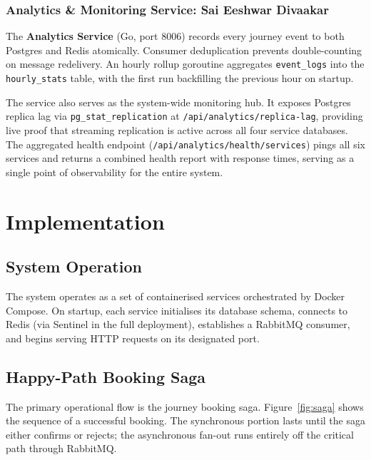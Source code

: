 \documentclass[12pt,a4paper]{article}
\begin{document}
\subsubsection{Analytics \& Monitoring Service: Sai Eeshwar Divaakar}
 
The \textbf{Analytics Service} (Go, port 8006) records every journey event to both Postgres and Redis atomically. Consumer deduplication prevents double-counting on message redelivery. An hourly rollup goroutine aggregates \texttt{event\_logs} into the \texttt{hourly\_stats} table, with the first run backfilling the previous hour on startup.
 
The service also serves as the system-wide monitoring hub. It exposes Postgres replica lag via \texttt{pg\_stat\_replication} at \texttt{/api/analytics/replica-lag}, providing live proof that streaming replication is active across all four service databases. The aggregated health endpoint (\texttt{/api/analytics/health/services}) pings all six services and returns a combined health report with response times, serving as a single point of observability for the entire system.
 
\section{Implementation}
\label{sec:implementation}
 
\subsection{System Operation}
 
The system operates as a set of containerised services orchestrated by Docker Compose. On startup, each service initialises its database schema, connects to Redis (via Sentinel in the full deployment), establishes a RabbitMQ consumer, and begins serving HTTP requests on its designated port.

\subsection{Happy-Path Booking Saga}

The primary operational flow is the journey booking saga. Figure~\ref{fig:saga} shows the sequence of a successful booking. The synchronous portion lasts until the saga either confirms or rejects; the asynchronous fan-out runs entirely off the critical path through RabbitMQ.
\end{document}
